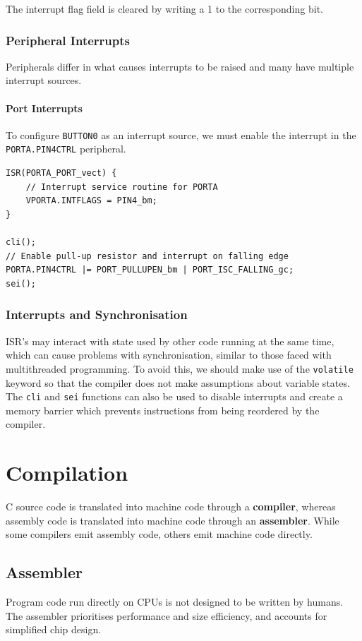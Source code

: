 \documentclass{report}
\begin{document}
The interrupt flag field is cleared by writing a 1 to the corresponding bit.
\subsection{Peripheral Interrupts}
Peripherals differ in what causes interrupts to be raised and many have multiple interrupt sources.
\subsubsection{Port Interrupts}
To configure \texttt{BUTTON0} as an interrupt source, we must enable the interrupt in the \texttt{PORTA.PIN4CTRL} peripheral.
\begin{verbatim}
ISR(PORTA_PORT_vect) {
    // Interrupt service routine for PORTA
    VPORTA.INTFLAGS = PIN4_bm;
}

cli();
// Enable pull-up resistor and interrupt on falling edge
PORTA.PIN4CTRL |= PORT_PULLUPEN_bm | PORT_ISC_FALLING_gc;
sei();
\end{verbatim}
\subsection{Interrupts and Synchronisation}
ISR's may interact with state used by other code running at the same time,
which can cause problems with synchronisation, similar to those faced with multithreaded programming.
To avoid this, we should make use of the \texttt{volatile} keyword
so that the compiler does not make assumptions about variable states.
The \texttt{cli} and \texttt{sei} functions can also be used to disable interrupts
and create a memory barrier which prevents instructions from being reordered by the compiler.
\chapter{Compilation}
C source code is translated into machine code through a \textbf{compiler}, whereas
assembly code is translated into machine code through an \textbf{assembler}.
While some compilers emit assembly code, others emit machine code directly.
\section{Assembler}
Program code run directly on CPUs is not designed to be written by humans.
The assembler prioritises performance and size efficiency, and accounts for
simplified chip design.
\end{document}
